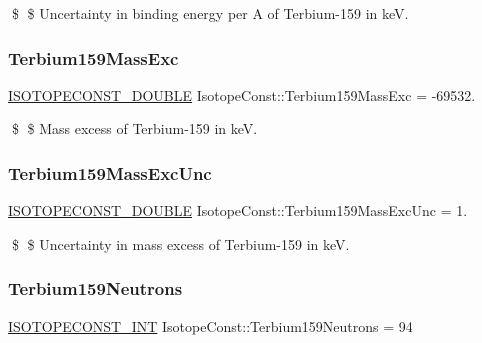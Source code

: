 \$ \$ Uncertainty in binding energy per A of Terbium-\/159 in keV. \mbox{\label{group___isotope_const-_terbium-_tb159_ga3bd8cd16b21771e7beec95db70f54197}} 
\subsubsection{\texorpdfstring{Terbium159\+Mass\+Exc}{Terbium159MassExc}}
{\footnotesize\ttfamily \mbox{\hyperlink{group___isotope_const-_macros_ga8f45a7272ce02c0b4c65c44636ed719a}{I\+S\+O\+T\+O\+P\+E\+C\+O\+N\+S\+T\+\_\+\+D\+O\+U\+B\+LE}} Isotope\+Const\+::\+Terbium159\+Mass\+Exc = -\/69532.}

\$ \$ Mass excess of Terbium-\/159 in keV. \mbox{\label{group___isotope_const-_terbium-_tb159_gaa4dd5e7f3c7ae2c0c483f017792d48a5}} 
\subsubsection{\texorpdfstring{Terbium159\+Mass\+Exc\+Unc}{Terbium159MassExcUnc}}
{\footnotesize\ttfamily \mbox{\hyperlink{group___isotope_const-_macros_ga8f45a7272ce02c0b4c65c44636ed719a}{I\+S\+O\+T\+O\+P\+E\+C\+O\+N\+S\+T\+\_\+\+D\+O\+U\+B\+LE}} Isotope\+Const\+::\+Terbium159\+Mass\+Exc\+Unc = 1.}

\$ \$ Uncertainty in mass excess of Terbium-\/159 in keV. \mbox{\label{group___isotope_const-_terbium-_tb159_gaba340d1fa17a868a5b38fe3e58dd2a55}} 
\subsubsection{\texorpdfstring{Terbium159\+Neutrons}{Terbium159Neutrons}}
{\footnotesize\ttfamily \mbox{\hyperlink{group___isotope_const-_macros_ga5f18360b3e99483a35c32d789e62621c}{I\+S\+O\+T\+O\+P\+E\+C\+O\+N\+S\+T\+\_\+\+I\+NT}} Isotope\+Const\+::\+Terbium159\+Neutrons = 94}

